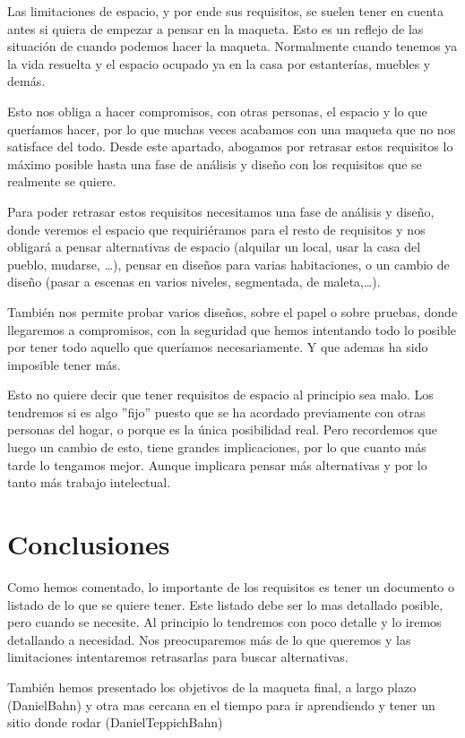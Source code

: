 Las limitaciones de espacio, y por ende sus requisitos, se suelen tener en cuenta antes si quiera de empezar
a pensar en la maqueta. Esto es un reflejo de las situación de cuando podemos hacer la maqueta.
Normalmente cuando tenemos ya la vida resuelta y el espacio ocupado ya en la casa por estanterías, muebles
y demás.

Esto nos obliga a hacer compromisos, con otras personas, el espacio y lo que queríamos hacer, por lo que
muchas veces acabamos con una maqueta que no nos satisface del todo. Desde este apartado, abogamos por
retrasar estos requisitos lo máximo posible hasta una fase de análisis y diseño con los requisitos que se
realmente se quiere.

Para poder retrasar estos requisitos necesitamos una fase de análisis y diseño, donde veremos el espacio
que requiriéramos para el resto de requisitos y nos obligará a pensar alternativas de espacio
(alquilar un local, usar la casa del pueblo, mudarse, …), pensar en diseños para varias habitaciones, o
un cambio de diseño (pasar a escenas en varios niveles, segmentada, de maleta,…).

También nos permite probar varios diseños, sobre el papel o sobre pruebas, donde llegaremos a compromisos,
con la seguridad que hemos intentando todo lo posible por tener todo aquello que queríamos necesariamente.
Y que ademas ha sido imposible tener más.

Esto no quiere decir que tener requisitos de espacio al principio sea malo. Los tendremos si es algo ”fijo”
puesto que se ha acordado previamente con otras personas del hogar, o porque es la única posibilidad real.
Pero recordemos que luego un cambio de esto, tiene grandes implicaciones, por lo que cuanto más tarde 
lo tengamos mejor. Aunque implicara pensar más alternativas y por lo tanto más trabajo intelectual.

\section{Conclusiones}
Como hemos comentado, lo importante de los requisitos es tener un documento o listado de lo que se quiere
tener. Este listado debe ser lo mas detallado posible, pero cuando se necesite. Al principio lo tendremos 
con poco detalle y lo iremos detallando a necesidad. Nos preocuparemos más de lo que queremos y las
limitaciones intentaremos retrasarlas para buscar alternativas.

También hemos presentado los objetivos de la maqueta final, a largo plazo (DanielBahn) y otra mas cercana
en el tiempo para ir aprendiendo y tener un sitio donde rodar (DanielTeppichBahn)

